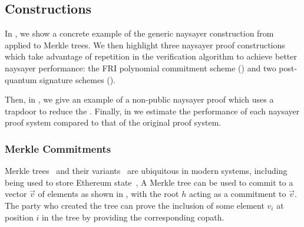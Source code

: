 \subsection{Constructions}\label{sec:naysayer_apps}

In , we show a concrete example of the generic naysayer construction from  applied to Merkle trees. We then highlight three naysayer proof constructions which take advantage of repetition in the verification algorithm to achieve better naysayer performance: the FRI polynomial commitment scheme () and two post-quantum signature schemes (). 

Then, in , we give an example of a non-public naysayer proof which uses a trapdoor to reduce the . 
Finally, in  we
estimate the performance of each naysayer proof system compared to that of the original proof system.

\subsubsection{Merkle Commitments}\label{sec:merkle_naysayer}


Merkle trees~\cite{todo} and their variants~\cite{patricia-trie} are ubiquitous in modern systems, including being used to store Ethereum state~\cite{todo},  A Merkle tree can be used to commit to a vector $\vec{v}$ of elements as shown in , with the root $h$ acting as a commitment to $\vec{v}$. The party who created the tree can prove the inclusion of some element $v_i$ at position $i$ in the tree by providing the corresponding copath. 

